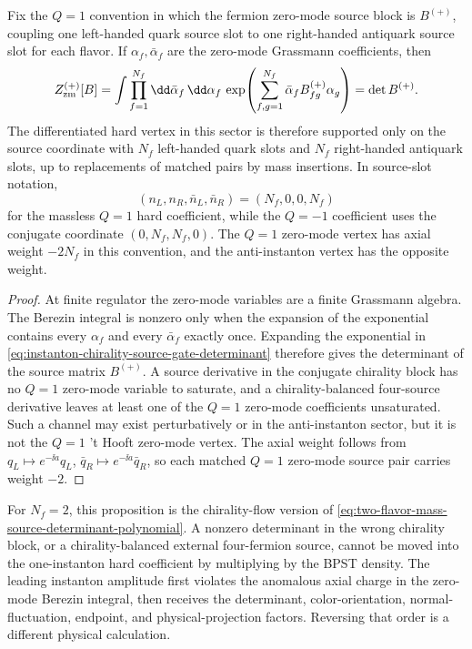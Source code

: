 \begin{proposition}
\label{prop:instanton-chirality-source-selection-gate}
Fix the \(Q=1\) convention in which the fermion zero-mode source block is
\(B^{(+)}\), coupling one left-handed quark source slot to one right-handed
antiquark source slot for each flavor.  If \(\alpha_f,\bar\alpha_f\) are the
zero-mode Grassmann coefficients, then
\begin{equation}
  Z_{\rm zm}^{(+)}[B]
  =
  \int
  \prod_{f=1}^{N_f}\dd\bar\alpha_f\,\dd\alpha_f\,
  \exp\!\left(
    \sum_{f,g=1}^{N_f}\bar\alpha_f B^{(+)}_{fg}\alpha_g
  \right)
  =
  \det B^{(+)} .
  \label{eq:instanton-chirality-source-gate-determinant}
\end{equation}
The differentiated hard vertex in this sector is therefore supported only on
the source coordinate with \(N_f\) left-handed quark slots and \(N_f\)
right-handed antiquark slots, up to replacements of matched pairs by mass
insertions.  In source-slot notation,
\[
  (n_L,n_R,\bar n_L,\bar n_R)=(N_f,0,0,N_f)
\]
for the massless \(Q=1\) hard coefficient, while the \(Q=-1\) coefficient uses
the conjugate coordinate \((0,N_f,N_f,0)\).  The \(Q=1\) zero-mode vertex has
axial weight \(-2N_f\) in this convention, and the anti-instanton vertex has
the opposite weight.
\end{proposition}

\begin{proof}
At finite regulator the zero-mode variables are a finite Grassmann algebra.
The Berezin integral is nonzero only when the expansion of the exponential
contains every \(\alpha_f\) and every \(\bar\alpha_f\) exactly once.  Expanding
the exponential in \eqref{eq:instanton-chirality-source-gate-determinant}
therefore gives the determinant of the source matrix \(B^{(+)}\).  A source
derivative in the conjugate chirality block has no \(Q=1\) zero-mode variable
to saturate, and a chirality-balanced four-source derivative leaves at least
one of the \(Q=1\) zero-mode coefficients unsaturated.  Such a channel may
exist perturbatively or in the anti-instanton sector, but it is not the
\(Q=1\) 't Hooft zero-mode vertex.  The axial weight follows from
\(q_L\mapsto e^{-\ii a}q_L\), \(\bar q_R\mapsto e^{-\ii a}\bar q_R\), so each
matched \(Q=1\) zero-mode source pair carries weight \(-2\).
\end{proof}

For \(N_f=2\), this proposition is the chirality-flow version of
\eqref{eq:two-flavor-mass-source-determinant-polynomial}.  A nonzero
determinant in the wrong chirality block, or a chirality-balanced external
four-fermion source, cannot be moved into the one-instanton hard coefficient
by multiplying by the BPST density.  The leading instanton amplitude first
violates the anomalous axial charge in the zero-mode Berezin integral, then
receives the determinant, color-orientation, normal-fluctuation, endpoint, and
physical-projection factors.  Reversing that order is a different physical
calculation.

